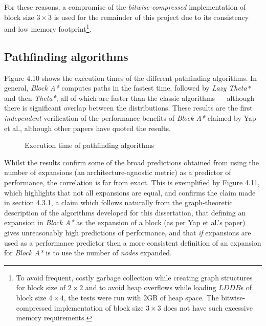 \documentclass[12pt,notitlepage]{report}
\begin{document}
\noindent
For these reasons, a compromise of the {\em bitwise-compressed} implementation of block size $3 \times 3$ is used for the remainder of this project due to its consistency and low memory footprint\footnote{To avoid frequent, costly garbage collection while creating graph structures for block size of $2 \times 2$ and to avoid heap overflows while loading $LDDB$s of block size $4 \times 4$, the tests were run with 2GB of heap space. The bitwise-compressed implementation of block size $3 \times 3$ does not have such excessive memory requirements.}.

\subsection{Pathfinding algorithms}
Figure 4.10 shows the execution times of the different pathfinding algorithms. In general, {\em Block A*} computes paths in the fastest time, followed by {\em Lazy Theta*} and then {\em Theta*}, all of which are faster than the classic algorithms --- although there is significant overlap between the distributions. These results are the first {\em independent} verification of the performance benefits of {\em Block A*} claimed by Yap et al., although other papers have quoted the results\cite{Nash12}\cite{Nash13}.\\

\begin{figure}
\centering

\caption{Execution time of pathfinding algorithms}
\end{figure}

\noindent 
Whilst the results confirm some of the broad predictions obtained from using the number of expansions (an architecture-agnostic metric) as a predictor of performance, the correlation is far from exact. This is exemplified by Figure 4.11, which highlights that not all expansions are equal, and confirms the claim made in section 4.3.1, a claim which follows naturally from the graph-theoretic description of the algorithms developed for this dissertation, that defining an expansion in {\em Block A*} as the expansion of a block (as per Yap et al.'s paper) gives unreasonably high predictions of performance, and that {\em if} expansions are used as a performance predictor then a more consistent definition of an expansion for {\em Block A*} is to use the number of {\em nodes} expanded.\\
\end{document}
